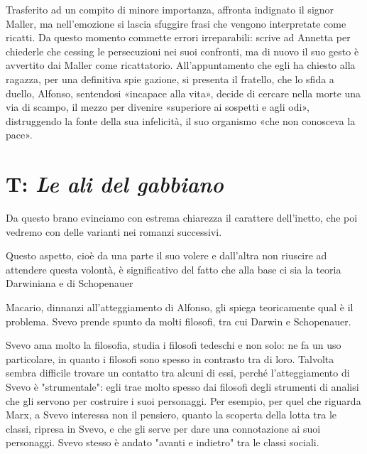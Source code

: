 Trasferito ad un compito di minore importanza, affronta indignato il signor Maller, ma nell'emozione si lascia sfuggire frasi che vengono interpretate come ricatti. Da questo momento commette errori irreparabili: scrive ad Annetta per chiederle che cessing le persecuzioni nei suoi confronti, ma di nuovo il suo gesto è avvertito dai Maller come ricattatorio. All'appuntamento che egli ha chiesto alla ragazza, per una definitiva spie gazione, si presenta il fratello, che lo sfida a duello, Alfonso, sentendosi «incapace alla vita», decide di cercare nella morte una via di scampo, il mezzo per divenire «superiore ai sospetti e agli odi», distruggendo la fonte della sua infelicità, il suo organismo «che non conosceva la pace».

\section{T: \textit{Le ali del gabbiano}}

Da questo brano evinciamo con estrema chiarezza il carattere dell'inetto, che poi vedremo con delle varianti nei romanzi successivi.

Questo aspetto, cioè da una parte il suo volere e dall'altra non riuscire ad attendere questa volontà, è significativo del fatto che alla base ci sia la teoria Darwiniana e di Schopenauer

Macario, dinnanzi all'atteggiamento di Alfonso, gli spiega teoricamente qual è il problema. Svevo prende spunto da molti filosofi, tra cui Darwin e Schopenauer.

Svevo ama molto la filosofia, studia i filosofi tedeschi e non solo: ne fa un uso particolare, in quanto i filosofi sono spesso in contrasto tra di loro. Talvolta sembra difficile trovare un contatto tra alcuni di essi, perché l'atteggiamento di Svevo è "strumentale": egli trae molto spesso dai filosofi degli strumenti di analisi che gli servono per costruire i suoi personaggi.
Per esempio, per quel che riguarda Marx, a Svevo interessa non il pensiero, quanto la scoperta della lotta tra le classi, ripresa in Svevo, e che gli serve per dare una connotazione ai suoi personaggi.
Svevo stesso è andato "avanti e indietro" tra le classi sociali.

